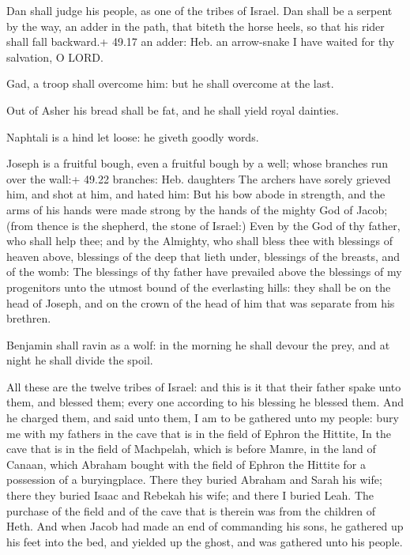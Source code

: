  Dan shall judge his people, as one of the tribes of
Israel.  Dan shall be a serpent by the way, an adder in the
path, that biteth the horse heels, so that his rider shall fall
backward.+ 49.17 an adder: Heb. an arrow-snake  I have
waited for thy salvation, O LORD.

 Gad, a troop shall overcome him: but he shall overcome
at the last.

 Out of Asher his bread shall be fat, and he shall yield
royal dainties.

 Naphtali is a hind let loose: he giveth goodly words.

 Joseph is a fruitful bough, even a fruitful bough by a
well; whose branches run over the wall:+ 49.22 branches: Heb. daughters
 The archers have sorely grieved him, and shot at him, and
hated him:  But his bow abode in strength, and the arms of
his hands were made strong by the hands of the mighty God of Jacob;
(from thence is the shepherd, the stone of Israel:)  Even
by the God of thy father, who shall help thee; and by the Almighty, who
shall bless thee with blessings of heaven above, blessings of the deep
that lieth under, blessings of the breasts, and of the womb:
 The blessings of thy father have prevailed above the
blessings of my progenitors unto the utmost bound of the everlasting
hills: they shall be on the head of Joseph, and on the crown of the head
of him that was separate from his brethren.

 Benjamin shall ravin as a wolf: in the morning he shall
devour the prey, and at night he shall divide the spoil.

 All these are the twelve tribes of Israel: and this is
it that their father spake unto them, and blessed them; every one
according to his blessing he blessed them.  And he charged
them, and said unto them, I am to be gathered unto my people: bury me
with my fathers in the cave that is in the field of Ephron the Hittite,
 In the cave that is in the field of Machpelah, which is
before Mamre, in the land of Canaan, which Abraham bought with the field
of Ephron the Hittite for a possession of a buryingplace. 
There they buried Abraham and Sarah his wife; there they buried Isaac
and Rebekah his wife; and there I buried Leah.  The
purchase of the field and of the cave that is therein was from the
children of Heth.  And when Jacob had made an end of
commanding his sons, he gathered up his feet into the bed, and yielded
up the ghost, and was gathered unto his people.

